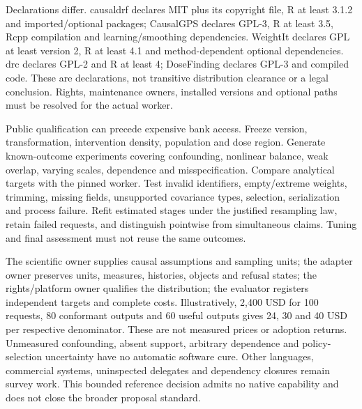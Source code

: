 Declarations differ. causaldrf declares MIT plus its copyright file, R at least
3.1.2 and imported/optional packages; CausalGPS declares GPL-3, R at least 3.5,
Rcpp compilation and learning/smoothing dependencies. WeightIt declares GPL
at least version 2, R at least 4.1 and method-dependent optional dependencies.
drc declares GPL-2 and R at least 4; DoseFinding declares GPL-3 and compiled
code. These are declarations, not transitive distribution clearance or a legal
conclusion. Rights, maintenance owners, installed versions and optional paths
must be resolved for the actual worker.
\citep{exec24_dose_causaldrf,exec24_dose_causalgps,exec24_dose_weightit,exec24_dose_drc,exec24_dose_dosefinding}

Public qualification can precede expensive bank access. Freeze version,
transformation, intervention density, population and dose region. Generate
known-outcome experiments covering confounding, nonlinear balance, weak overlap,
varying scales, dependence and misspecification. Compare analytical targets with
the pinned worker. Test invalid identifiers, empty/extreme weights, trimming,
missing fields, unsupported covariance types, selection, serialization and
process failure. Refit estimated stages under the justified resampling law,
retain failed requests, and distinguish pointwise from simultaneous claims.
Tuning and final assessment must not reuse the same outcomes.
\citep{exec24_dose_contract}

The scientific owner supplies causal assumptions and sampling units; the
adapter owner preserves units, measures, histories, objects and refusal states;
the rights/platform owner qualifies the distribution; the evaluator registers
independent targets and complete costs. Illustratively, 2,400 USD for 100
requests, 80 conformant outputs and 60 useful outputs gives 24, 30 and 40 USD
per respective denominator. These are not measured prices or adoption returns.
Unmeasured confounding, absent support, arbitrary dependence and policy-selection
uncertainty have no automatic software cure. Other languages, commercial
systems, uninspected delegates and dependency closures remain survey work.
This bounded reference decision admits no native capability and does not close
the broader proposal standard.~\citep{exec24_dose_contract}
